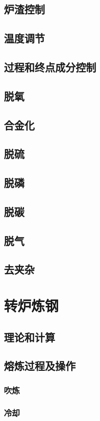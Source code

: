 \documentclass[UTF8]{../../ApplicationUniverse}
\begin{document}
    \subsection{炉渣控制}
    \subsection{温度调节}
    \subsection{过程和终点成分控制}
    \subsection{脱氧}
    \subsection{合金化}
    \subsection{脱硫}
    \subsection{脱磷}
    \subsection{脱碳}
    \subsection{脱气}
    \subsection{去夹杂}
\section{转炉炼钢}
    \subsection{理论和计算}
    \subsection{熔炼过程及操作}
        \subsubsection{吹炼}
        \subsubsection{冷却}
\end{document}
